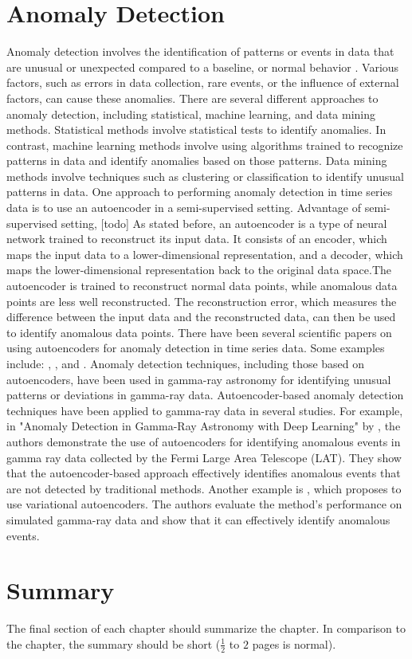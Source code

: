 \section{Anomaly Detection}
Anomaly detection involves the identification of patterns or events in data that are unusual or unexpected compared to a baseline, or normal behavior  \cite{chandola2009anomaly}. Various factors, such as errors in data collection, rare events, or the influence of external factors, can cause these anomalies.
There are several different approaches to anomaly detection, including statistical, machine learning, and data mining methods. Statistical methods involve statistical tests to identify anomalies. In contrast, machine learning methods involve using algorithms trained to recognize patterns in data and identify anomalies based on those patterns. Data mining methods involve techniques such as clustering or classification to identify unusual patterns in data.
One approach to performing anomaly detection in time series data is to use an autoencoder in a semi-supervised setting. Advantage of semi-supervised setting, [todo] As stated before, an autoencoder is a type of neural network trained to reconstruct its input data. It consists of an encoder, which maps the input data to a lower-dimensional representation, and a decoder, which maps the lower-dimensional representation back to the original data space.The autoencoder is trained to reconstruct normal data points, while anomalous data points are less well reconstructed. The reconstruction error, which measures the difference between the input data and the reconstructed data, can then be used to identify anomalous data points. There have been several scientific papers on using autoencoders for anomaly detection in time series data. Some examples include: \cite{wang2020anomaly}, \cite{malhotra2016anomaly}, and \cite{zimmerer2018unsupervised}. Anomaly detection techniques, including those based on autoencoders, have been used in gamma-ray astronomy for identifying unusual patterns or deviations in gamma-ray data. Autoencoder-based anomaly detection techniques have been applied to gamma-ray data in several studies. For example, in "Anomaly Detection in Gamma-Ray Astronomy with Deep Learning" by \cite{fabbro2019anomaly}, the authors demonstrate the use of autoencoders for identifying anomalous events in gamma ray data collected by the Fermi Large Area Telescope (LAT). They show that the autoencoder-based approach effectively identifies anomalous events that are not detected by traditional methods. Another example is \cite{guo2020anomaly}, which proposes to use variational autoencoders. The authors evaluate the method's performance on simulated gamma-ray data and show that it can effectively identify anomalous events. 






\section{Summary}
\label{s:Background-Summary}

The final section of each chapter should summarize the chapter. In comparison to the chapter, the summary should be short ($\frac{1}{2}$ to $2$ pages is normal).